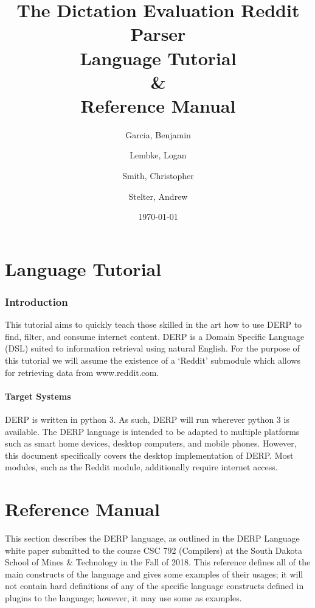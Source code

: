 \documentclass{article}
\title{\textbf{The Dictation Evaluation Reddit Parser \\ Language Tutorial \\ \& \\ Reference Manual}}
\author{
Garcia, Benjamin \and
Lembke, Logan \and
Smith, Christopher \and
Stelter, Andrew
}
\date{\today}
\begin{document}
\maketitle %

\newpage
\tableofcontents




\newpage


\part{Language Tutorial}
\section{Introduction}
This tutorial aims to quickly teach those skilled in the art how to use DERP to find, filter, and consume internet content. DERP is a Domain Specific Language (DSL) suited to information retrieval using natural English. For the purpose of this tutorial we will assume the existence of a ‘Reddit’ submodule which allows for retrieving data from www.reddit.com.

\subsection{Target Systems}
DERP is written in python 3. As such, DERP will run wherever python 3 is available. The DERP language is intended to be adapted to multiple platforms such as smart home devices, desktop computers, and mobile phones. However, this document specifically covers the desktop implementation of DERP. Most modules, such as the Reddit module, additionally require internet access.





\break

\part{Reference Manual}
This section describes the DERP language, as outlined in the DERP Language white paper submitted
to the course CSC 792 (Compilers) at the South Dakota School of Mines \& Technology in the Fall
of 2018. This reference defines all of the main constructs of the language and gives some examples
of their usages; it will not contain hard definitions of any of the specific language constructs
defined in plugins to the language; however, it may use some as examples.






\end{document}
